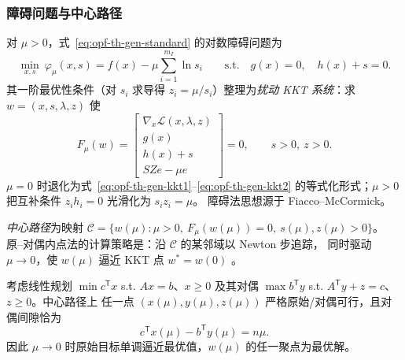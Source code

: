 \subsubsection{障碍问题与中心路径}

\begin{definition}\label{def:opf-th-gen-barrier}
对 $\mu>0$，式~\eqref{eq:opf-th-gen-standard} 的对数障碍问题为
\begin{equation}
\min_{x,s}\ \varphi_\mu(x,s)=f(x)-\mu\sum_{i=1}^{m_I}\ln s_i
\qquad\text{s.t.}\quad g(x)=0,\quad h(x)+s=0 .
\label{eq:opf-th-gen-barrier}
\end{equation}
其一阶最优性条件（对 $s_i$ 求导得 $z_i=\mu/s_i$）整理为\emph{扰动 KKT
系统}：求 $w=(x,s,\lambda,z)$ 使
\begin{equation}
F_\mu(w)=
\begin{bmatrix}
\nabla_x\mathcal L(x,\lambda,z)\\
g(x)\\
h(x)+s\\
SZe-\mu e
\end{bmatrix}=0,\qquad s>0,\ z>0 .
\label{eq:opf-th-gen-perturbed-kkt}
\end{equation}
$\mu=0$ 时退化为式~\eqref{eq:opf-th-gen-kkt1}--\eqref{eq:opf-th-gen-kkt2}
的等式化形式；$\mu>0$ 把互补条件 $z_ih_i=0$ 光滑化为 $s_iz_i=\mu$。
障碍法思想源于 Fiacco--McCormick\cite{opft:fiacco-mccormick}。
\end{definition}

\begin{definition}[中心路径]\label{def:opf-th-gen-central-path}
\emph{中心路径}为映射
$\mathcal C=\{w(\mu):\mu>0,\ F_\mu(w(\mu))=0,\ s(\mu),z(\mu)>0\}$。
原--对偶内点法的计算策略是：沿 $\mathcal C$ 的某邻域以 Newton 步追踪，
同时驱动 $\mu\to0$，使 $w(\mu)$ 逼近 KKT 点 $w^*=w(0)$
\cite{opft:wright-ipm,opft:forsgren-gill-wright}。
\end{definition}

\begin{theorem}[凸 LP 中心路径的对偶间隙刻画]\label{thm:opf-th-gen-gap}
考虑线性规划 $\min c^{\mathsf T}x$ s.t. $Ax=b$、$x\ge0$ 及其对偶
$\max b^{\mathsf T}y$ s.t. $A^{\mathsf T}y+z=c$、$z\ge0$。中心路径上
任一点 $(x(\mu),y(\mu),z(\mu))$ 严格原始/对偶可行，且对偶间隙恰为
\begin{equation}
c^{\mathsf T}x(\mu)-b^{\mathsf T}y(\mu)=n\mu .
\label{eq:opf-th-gen-gap}
\end{equation}
因此 $\mu\to0$ 时原始目标单调逼近最优值，$w(\mu)$ 的任一聚点为最优解。
\end{theorem}

